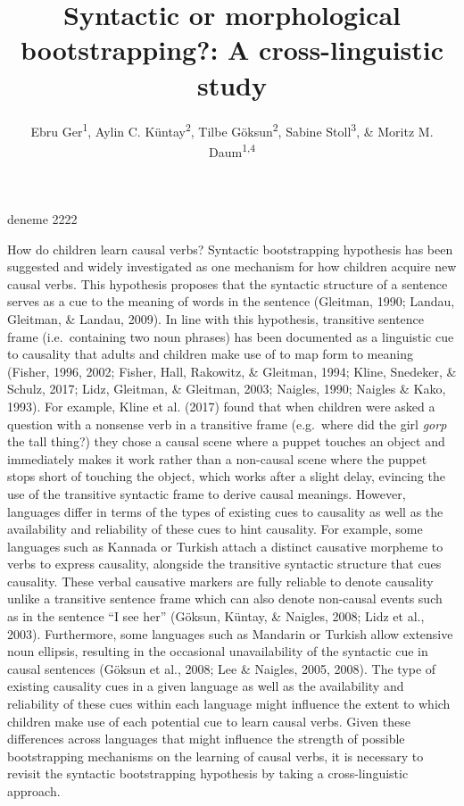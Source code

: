 \documentclass[man]{apa6}
\title{Syntactic or morphological bootstrapping?: A cross-linguistic study}
\author{Ebru Ger\textsuperscript{1}, Aylin C. Küntay\textsuperscript{2}, Tilbe
Göksun\textsuperscript{2}, Sabine Stoll\textsuperscript{3}, \& Moritz M.
Daum\textsuperscript{1,4}}
\date{}
\affiliation{
\vspace{0.5cm}
\textsuperscript{1} Department of Psychology, University of Zurich\\\textsuperscript{2} Department of Psychology, Koç University\\\textsuperscript{3} Institute of Comparative Linguistics, University of Zurich\\\textsuperscript{4} Neuroscience Center Zurich, University of Zurich and ETH Zurich}
\begin{document}
\maketitle

deneme 2222

How do children learn causal verbs? Syntactic bootstrapping hypothesis
has been suggested and widely investigated as one mechanism for how
children acquire new causal verbs. This hypothesis proposes that the
syntactic structure of a sentence serves as a cue to the meaning of words in the
sentence \cite{gleitman1990structural} (Gleitman, 1990; Landau, Gleitman, \& Landau,
2009). In line with this hypothesis, transitive sentence frame (i.e.~containing two
noun phrases) has been documented as a linguistic cue to causality that
adults and children make use of to map form to meaning (Fisher, 1996,
2002; Fisher, Hall, Rakowitz, \& Gleitman, 1994; Kline, Snedeker, \&
Schulz, 2017; Lidz, Gleitman, \& Gleitman, 2003; Naigles, 1990; Naigles \& Kako,
1993). For example, Kline et al. (2017) found that when
children were asked a question with a nonsense verb in a transitive
frame (e.g.~where did the girl \emph{gorp} the tall thing?) they chose a
causal scene where a puppet touches an object and immediately makes it
work rather than a non-causal scene where the puppet stops short of
touching the object, which works after a slight delay, evincing the use
of the transitive syntactic frame to derive causal meanings. However,
languages differ in terms of the types of existing cues to causality as
well as the availability and reliability of these cues to hint
causality. For example, some languages such as Kannada or Turkish attach
a distinct causative morpheme to verbs to express causality, alongside
the transitive syntactic structure that cues causality. These verbal
causative markers are fully reliable to denote causality unlike a
transitive sentence frame which can also denote non-causal events such
as in the sentence \enquote{I see her} (Göksun, Küntay, \& Naigles,
2008; Lidz et al., 2003). Furthermore, some languages such as Mandarin
or Turkish allow extensive noun ellipsis, resulting in the occasional
unavailability of the syntactic cue in causal sentences (Göksun et al.,
2008; Lee \& Naigles, 2005, 2008). The type of existing causality cues
in a given language as well as the availability and reliability of these
cues within each language might influence the extent to which children
make use of each potential cue to learn causal verbs. Given these
differences across languages that might influence the strength of
possible bootstrapping mechanisms on the learning of causal verbs, it is
necessary to revisit the syntactic bootstrapping hypothesis by taking a
cross-linguistic approach.
\end{document}

